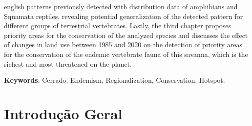 \documentclass[12pt,openright,oneside,a4paper,english]{abntex2}
\begin{document}
\begin{resumo}[Abstract]
\begin{otherlanguage*}{english}
patterns previously detected with distribution data of amphibians and Squamata reptiles, revealing potential generalization of the detected pattern for different groups of terrestrial vertebrates. Lastly, the third chapter proposes priority areas for the conservation of the analyzed species and discusses the effect of changes in land use between 1985 and 2020 on the detection of priority areas for the conservation of the endemic vertebrate fauna of this savanna, which is the richest and most threatened on the planet.
		\vspace{\onelineskip}
		\noindent
		
		\textbf{Keywords}: Cerrado, Endemism, Regionalization, Conservation, Hotspot.
	\end{otherlanguage*}
\end{resumo}

\tableofcontents
{}

\pagebreak


\textual
\setlength{\parindent}{1cm}
\newpage


\chapter*[Introdução Geral]{Introdução Geral}

\end{document}
